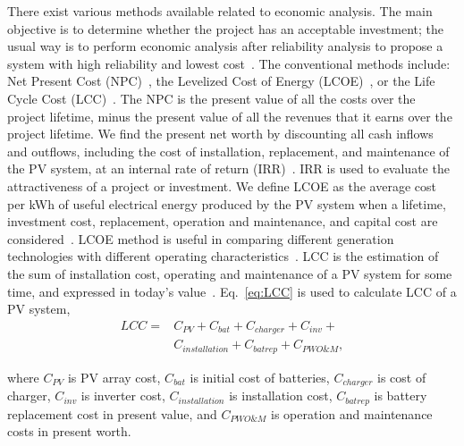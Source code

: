 \documentclass[journal]{IEEEtran}
\begin{document}
There exist various methods available related to economic analysis. The main objective is to determine whether the project has an acceptable investment; the usual way is to perform economic analysis after reliability analysis to propose a system with high reliability and lowest cost~\cite{Alsadi2018}. The conventional methods include: Net Present Cost (NPC)~\cite{Park2004}, the Levelized Cost of Energy (LCOE)~\cite{Zhou2010}, or the Life Cycle Cost (LCC)~\cite{Applasamy2011}. The NPC is the present value of all the costs over the project lifetime, minus the present value of all the revenues that it earns over the project lifetime. We find the present net worth by discounting all cash inflows and outflows, including the cost of installation, replacement, and maintenance of the PV system, at an internal rate of return (IRR)~\cite{Park2004}. IRR is used to evaluate the attractiveness of a project or investment. We define LCOE as the average cost per kWh of useful electrical energy produced by the PV system when a lifetime, investment cost, replacement, operation and maintenance, and capital cost are considered~\cite{Kamel2005}. LCOE method is useful in comparing different generation technologies with different operating characteristics~\cite{Zhou2010}. LCC is the estimation of the sum of installation cost, operating and maintenance of a PV system for some time, and expressed in today's value~\cite{Applasamy2011}. Eq.~\eqref{eq:LCC} is used to calculate LCC of a PV system,
%
\begin{equation}
\label{eq:LCC}
\begin{aligned}
LCC = & C_{PV} + C_{bat} + C_{charger} + C_{inv} + \\
      & C_{installation} + C_{batrep} + C_{PWO\&M},
\end{aligned}
\end{equation}

\noindent where $C_{PV}$ is PV array cost, $C_{bat}$ is initial cost of batteries, $C_{charger}$ is cost of charger, $C_{inv}$ is inverter cost, $C_{installation}$ is installation cost, $C_{batrep}$ is battery replacement cost in present value, and $C_{PWO\&M}$ is operation and maintenance costs 
in present worth.
\end{document}

